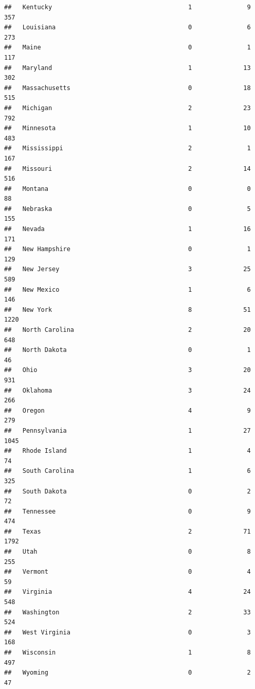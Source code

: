 \documentclass[
]{book}
\theoremstyle{definition}
\theoremstyle{definition}
\theoremstyle{definition}
\theoremstyle{remark}
\begin{document}
\begin{verbatim}
##   Kentucky                                     1               9   357
##   Louisiana                                    0               6   273
##   Maine                                        0               1   117
##   Maryland                                     1              13   302
##   Massachusetts                                0              18   515
##   Michigan                                     2              23   792
##   Minnesota                                    1              10   483
##   Mississippi                                  2               1   167
##   Missouri                                     2              14   516
##   Montana                                      0               0    88
##   Nebraska                                     0               5   155
##   Nevada                                       1              16   171
##   New Hampshire                                0               1   129
##   New Jersey                                   3              25   589
##   New Mexico                                   1               6   146
##   New York                                     8              51  1220
##   North Carolina                               2              20   648
##   North Dakota                                 0               1    46
##   Ohio                                         3              20   931
##   Oklahoma                                     3              24   266
##   Oregon                                       4               9   279
##   Pennsylvania                                 1              27  1045
##   Rhode Island                                 1               4    74
##   South Carolina                               1               6   325
##   South Dakota                                 0               2    72
##   Tennessee                                    0               9   474
##   Texas                                        2              71  1792
##   Utah                                         0               8   255
##   Vermont                                      0               4    59
##   Virginia                                     4              24   548
##   Washington                                   2              33   524
##   West Virginia                                0               3   168
##   Wisconsin                                    1               8   497
##   Wyoming                                      0               2    47
\end{verbatim}
\end{document}
